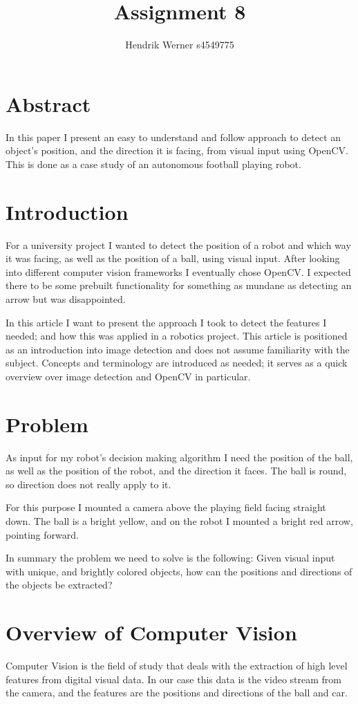 \documentclass[12pt, a4paper]{article}
\title{Assignment 8}
\author{Hendrik Werner s4549775}
\begin{document}
\maketitle

\section{Abstract}
In this paper I present an easy to understand and follow approach to detect an object's position, and the direction it is facing, from visual input using OpenCV. This is done as a case study of an autonomous football playing robot.

\section{Introduction}
For a university project I wanted to detect the position of a robot and which way it was facing, as well as the position of a ball, using visual input. After looking into different computer vision frameworks I eventually chose OpenCV. I expected there to be some prebuilt functionality for something as mundane as detecting an arrow but was disappointed.

In this article I want to present the approach I took to detect the features I needed; and how this was applied in a robotics project. This article is positioned as an introduction into image detection and does not assume familiarity with the subject. Concepts and terminology are introduced as needed; it serves as a quick overview over image detection and OpenCV in particular.

\section{Problem}
As input for my robot's decision making algorithm I need the position of the ball, as well as the position of the robot, and the direction it faces. The ball is round, so direction does not really apply to it.

For this purpose I mounted a camera above the playing field facing straight down. The ball is a bright yellow, and on the robot I mounted a bright red arrow, pointing forward.

In summary the problem we need to solve is the following: Given visual input with unique, and brightly colored objects, how can the positions and directions of the objects be extracted?

\section{Overview of Computer Vision}
Computer Vision is the field of study that deals with the extraction of high level features from digital visual data. In our case this data is the video stream from the camera, and the features are the positions and directions of the ball and car.
\end{document}
